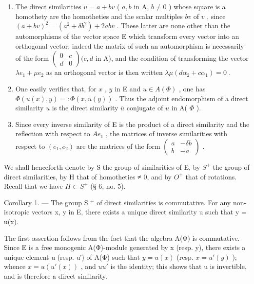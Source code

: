 \begin{enumerate}
\def\labelenumi{\arabic{enumi})}
\setcounter{enumi}{1}
\item
  The direct similarities \(u = a + bv\) ( \(a, b\) in A, \(b \neq 0\) ) whose square is a homothety are the homotheties and the scalar multiples \(bv\) of \(v\) , since \((a + bv)^{2} = (a^{2} + \delta b^{2}) + 2abv\) . These latter are none other than the automorphisms of the vector space E which transform every vector into an orthogonal vector; indeed the matrix of such an automorphism is necessarily of the form \(\begin{pmatrix} 0 & c \\ d & 0 \end{pmatrix} (c, d\) in A), and the condition of transforming the vector \(\lambda e_{1} + \mu e_{2}\) as an orthogonal vector is then written \(\lambda \mu(d\alpha_{2} + c\alpha_{1}) = 0\) .
\item
  One easily verifies that, for \(x\) , \(y\) in E and \(u \in A(\Phi)\) , one has \(\Phi(u(x), y) =: \Phi(x, \overline{u}(y))\) . Thus the adjoint endomorphism of a direct similarity \(u\) is the direct similarity \(\overline{u}\) conjugate of \(u\) in A( \(\Phi\) ).
\item
  Since every inverse similarity of E is the product of a direct similarity and the reflection with respect to \(Ae_{1}\) , the matrices of inverse similarities with respect to \((e_{1}, e_{2})\) are the matrices of the form \(\begin{pmatrix} a & -\delta b \\ b & -a \end{pmatrix}\) .
\end{enumerate}

We shall henceforth denote by S the group of similarities of E, by \(S^{+}\) the group of direct similarities, by H that of homotheties ≠ 0, and by \(O^{+}\) that of rotations. Recall that we have \(H \subset S^{+}\) (§ 6, no. 5).

Corollary 1. --- The group S \(^{+}\) of direct similarities is commutative. For any non-isotropic vectors x, y in E, there exists a unique direct similarity u such that y = u(x).

The first assertion follows from the fact that the algebra A(Φ) is commutative. Since E is a free monogenic A(Φ)-module generated by x (resp. y), there exists a unique element u (resp. u′) of A(Φ) such that \(y = u(x)\) (resp. \(x = u'(y)\) ); whence \(x = u(u'(x))\) , and \(uu'\) is the identity; this shows that u is invertible, and is therefore a direct similarity.

